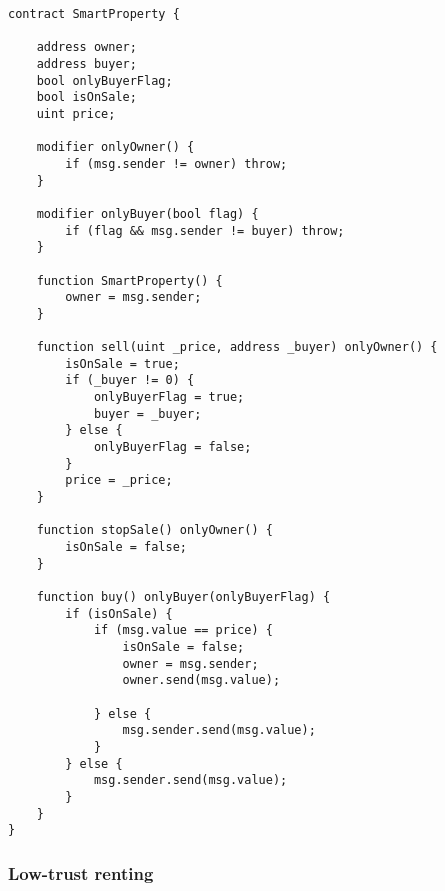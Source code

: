 \newpage
\begin{lstlisting}[breaklines,basicstyle=\tiny]
contract SmartProperty {
    
    address owner;
    address buyer;
    bool onlyBuyerFlag;
    bool isOnSale;
    uint price;
    
    modifier onlyOwner() {
        if (msg.sender != owner) throw;
    }
    
    modifier onlyBuyer(bool flag) {
        if (flag && msg.sender != buyer) throw;
    }
    
    function SmartProperty() {
        owner = msg.sender;
    }
    
    function sell(uint _price, address _buyer) onlyOwner() {
        isOnSale = true;
        if (_buyer != 0) {
            onlyBuyerFlag = true;
            buyer = _buyer;
        } else {
            onlyBuyerFlag = false;
        }
        price = _price;
    }
    
    function stopSale() onlyOwner() {
        isOnSale = false;
    }
        
    function buy() onlyBuyer(onlyBuyerFlag) {
        if (isOnSale) {
            if (msg.value == price) {
                isOnSale = false;
                owner = msg.sender;
                owner.send(msg.value);
                
            } else {
                msg.sender.send(msg.value);
            }
        } else {
            msg.sender.send(msg.value);
        }
    }
}
\end{lstlisting}



\subsubsection{Low-trust renting}

